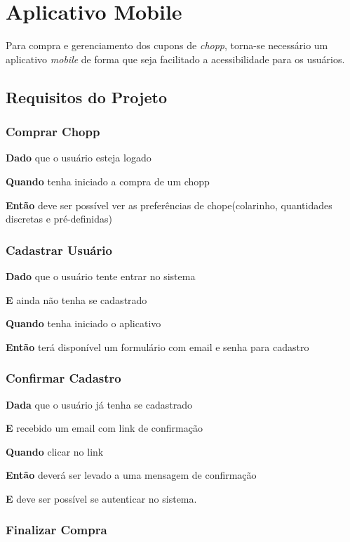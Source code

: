         
\section[Aplicativo Mobile]{Aplicativo Mobile}

Para compra e gerenciamento dos cupons de \textit{chopp}, torna-se necessário um aplicativo \textit{mobile} de forma que seja facilitado a acessibilidade para os usuários.

\subsection{Requisitos do Projeto}

\subsubsection{Comprar Chopp}

\textbf{Dado} que o usuário esteja logado

\textbf{Quando} tenha iniciado a compra de um chopp

\textbf{Então} deve ser possível ver as preferências de chope(colarinho, quantidades discretas e pré-definidas)

\subsubsection{Cadastrar Usuário}

\textbf{Dado} que o usuário tente entrar no sistema 

\textbf{E} ainda não tenha se cadastrado

\textbf{Quando} tenha iniciado o aplicativo

\textbf{Então} terá disponível um formulário com email e senha para cadastro

\subsubsection{Confirmar Cadastro}

\textbf{Dada} que o usuário já tenha se cadastrado

\textbf{E} recebido um email com link de confirmação

\textbf{Quando} clicar no link

\textbf{Então} deverá ser levado a uma mensagem de confirmação

\textbf{E} deve ser possível se autenticar no sistema.

\subsubsection{Finalizar Compra}

